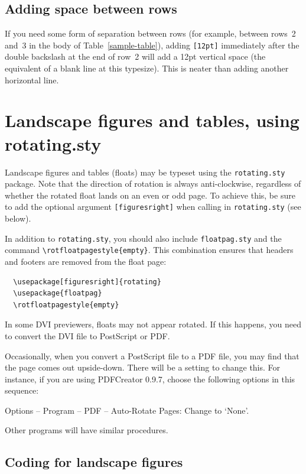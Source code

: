 \subsection{Adding space between rows}
If you need some form of separation between rows (for example, between rows~2 and~3 in the body of Table~\ref{sample-table}), adding \verb"[12pt]" immediately after the double backslash at the end of row~2 will add a 12pt vertical space (the equivalent of a blank line at this typesize). This is neater than adding another horizontal line.


\section{Landscape figures and tables, using rotating.sty}

Landscape figures and tables (floats) may be typeset using the \verb"rotating.sty" package. Note that the direction of rotation is always anti-clockwise, regardless of whether the rotated float lands on an even or odd page. To achieve this, be sure to add the optional argument \verb"[figuresright]" when calling in \verb"rotating.sty" (see below).

In addition to \verb"rotating.sty", you should also include \verb"floatpag.sty" and the command \verb"\rotfloatpagestyle{empty}". This combination ensures that headers and footers are removed from the float page:
\begin{verbatim}
  \usepackage[figuresright]{rotating}
  \usepackage{floatpag}
  \rotfloatpagestyle{empty}
\end{verbatim}
In some DVI previewers, floats may not appear rotated. If this happens, you need to convert the DVI file to PostScript or PDF.

Occasionally, when you convert a PostScript file to a PDF file, you may find that the page comes out upside-down. There will be a setting to change this. For instance, if you are using PDFCreator 0.9.7, choose the following options in this sequence:
\begin{description}
  \item Options -- Program -- PDF -- Auto-Rotate Pages: Change to `None'.
\end{description}
Other programs will have similar procedures.

\subsection{Coding for landscape figures}

